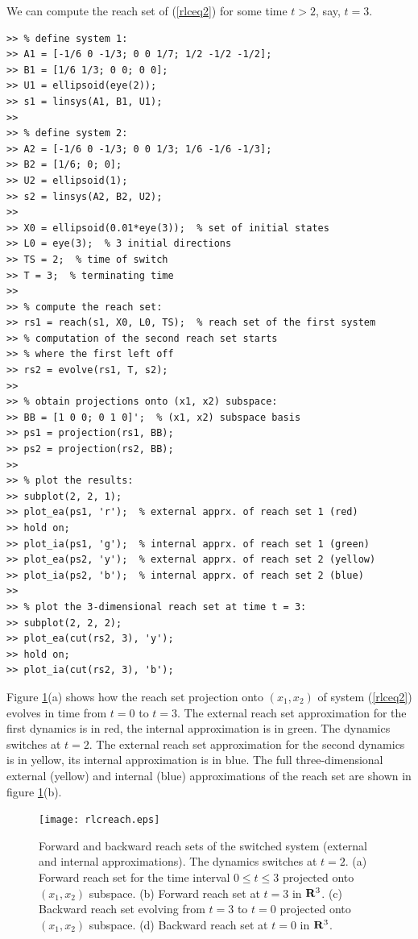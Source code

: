 \documentclass{report}
\begin{document}
We can compute the reach set of (\ref{rlceq2}) for some time $t>2$, say, $t=3$.
{\tt \begin{verbatim}
>> % define system 1:
>> A1 = [-1/6 0 -1/3; 0 0 1/7; 1/2 -1/2 -1/2];
>> B1 = [1/6 1/3; 0 0; 0 0];
>> U1 = ellipsoid(eye(2));
>> s1 = linsys(A1, B1, U1);
>>
>> % define system 2:
>> A2 = [-1/6 0 -1/3; 0 0 1/3; 1/6 -1/6 -1/3];
>> B2 = [1/6; 0; 0];
>> U2 = ellipsoid(1);
>> s2 = linsys(A2, B2, U2);
>>
>> X0 = ellipsoid(0.01*eye(3));  % set of initial states
>> L0 = eye(3);  % 3 initial directions
>> TS = 2;  % time of switch
>> T = 3;  % terminating time
>>
>> % compute the reach set:
>> rs1 = reach(s1, X0, L0, TS);  % reach set of the first system
>> % computation of the second reach set starts
>> % where the first left off
>> rs2 = evolve(rs1, T, s2);
>>
>> % obtain projections onto (x1, x2) subspace:
>> BB = [1 0 0; 0 1 0]';  % (x1, x2) subspace basis
>> ps1 = projection(rs1, BB);
>> ps2 = projection(rs2, BB);
>>
>> % plot the results:
>> subplot(2, 2, 1);
>> plot_ea(ps1, 'r');  % external apprx. of reach set 1 (red)
>> hold on;
>> plot_ia(ps1, 'g');  % internal apprx. of reach set 1 (green)
>> plot_ea(ps2, 'y');  % external apprx. of reach set 2 (yellow)
>> plot_ia(ps2, 'b');  % internal apprx. of reach set 2 (blue)
>>
>> % plot the 3-dimensional reach set at time t = 3:
>> subplot(2, 2, 2);
>> plot_ea(cut(rs2, 3), 'y');
>> hold on;
>> plot_ia(cut(rs2, 3), 'b');
\end{verbatim}}
Figure \ref{rlcreachfig}(a) shows how the reach set projection
onto $(x_1, x_2)$ of system (\ref{rlceq2})
evolves in time from $t=0$  to $t=3$. The external reach set approximation
for the first dynamics is in red, the internal approximation is in green.
The dynamics switches at $t=2$.
The external reach set approximation for the second dynamics is in yellow,
its internal approximation is in blue.
The full three-dimensional external (yellow) and internal (blue)
approximations of the reach set are shown in figure \ref{rlcreachfig}(b).
\begin{figure}[htbp]
\centerline{
\texttt{[image: rlcreach.eps]}}
\caption{Forward and backward reach sets of the switched system
(external and internal approximations).
The dynamics switches at $t=2$.
\newline
(a) Forward reach set for the time interval $0\leq t\leq3$ projected onto
$(x_1,x_2)$ subspace.
\newline
(b) Forward reach set at $t=3$ in ${\bf R}^3$.
\newline
(c) Backward reach set evolving from $t=3$ to $t=0$ projected onto
$(x_1,x_2)$ subspace.
\newline
(d) Backward reach set at $t=0$ in ${\bf R}^3$.}
\label{rlcreachfig}
\end{figure}
\end{document}
